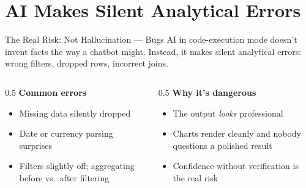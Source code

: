 \documentclass[aspectratio=169]{beamer}
\begin{document}
\section{AI Makes Silent Analytical Errors}

\begin{frame}{The Real Risk: Not Hallucination --- Bugs}
AI in code-execution mode doesn't invent facts the way a chatbot might. Instead, it makes \alert{silent analytical errors}: wrong filters, dropped rows, incorrect joins.
\vspace{0.5cm}
\begin{columns}[T]
\begin{column}{0.5\textwidth}
\textbf{Common errors}
\begin{itemize}\small
  \item Missing data silently dropped
  \item Date or currency parsing surprises
  \item Filters slightly off; aggregating before vs.\ after filtering
\end{itemize}
\end{column}
\begin{column}{0.5\textwidth}
\textbf{Why it's dangerous}
\begin{itemize}\small
  \item The output \textit{looks} professional
  \item Charts render cleanly and nobody questions a polished result
  \item \alert{Confidence without verification is the real risk}
\end{itemize}
\end{column}
\end{columns}
\end{frame}
\end{document}
